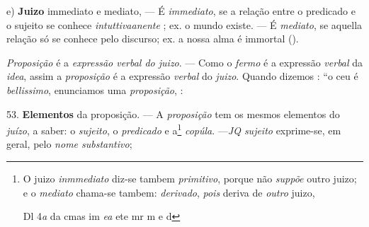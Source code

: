 e) \textbf{Juizo} immediato e mediato, --- É \emph{immediato}, se a relação entre o predicado e o sujeito se conhece \emph{intuttivaanente} ; ex. o mundo existe. --- É \emph{mediato}, se aquella relação só se conhece pelo discurso; ex. a nossa alma é immortal ().


\emph{Proposição} é a \emph{expressão verbal do juizo}. --- Como o \emph{fermo} é a expressão \emph{verbal} da \emph{idea}, assim a \emph{proposição} é a expressão \emph{verbal} do \emph{juizo}. Quando dizemos : “o ceu é \emph{bellissimo}, enunciamos uma \emph{proposição}, :

53. \textbf{Elementos} da proposição. --- A \emph{proposição} tem os mesmos elementos do \emph{juízo}, a saber: o \emph{sujeito}, o \emph{predicado} e a\footnote{O juizo \emph{inmmediato} diz-se tambem \emph{primitivo}, porque não \emph{suppõe} outro juizo; e o \emph{mediato} chama-se tambem: \emph{derivado}, \emph{pois} deriva de \emph{outro} juizo,\par Dl 4\emph{a} da cmas im \emph{ea} ete mr m e d}   \emph{copúla}. ---\emph{JQ sujeito} exprime-se, em geral, pelo \emph{nome substantivo};

